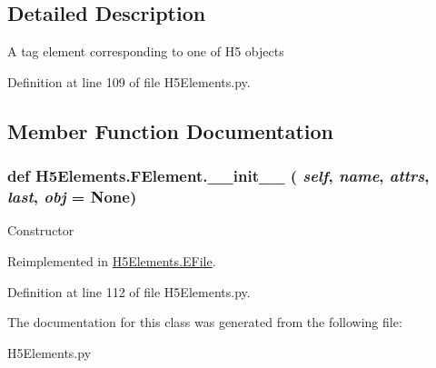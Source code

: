 \subsection{Detailed Description}
\begin{DoxyVerb}A tag element corresponding to one of H5 objects \end{DoxyVerb}
 

Definition at line 109 of file H5Elements.py.

\subsection{Member Function Documentation}
\hypertarget{classH5Elements_1_1FElement_ac013d152339bec50771f059a62e764c7}{
\subsubsection[{\_\-\_\-init\_\-\_\-}]{\setlength{\rightskip}{0pt plus 5cm}def H5Elements.FElement.\_\-\_\-init\_\-\_\- ( {\em self}, \/   {\em name}, \/   {\em attrs}, \/   {\em last}, \/   {\em obj} = {\ttfamily None})}}
\label{classH5Elements_1_1FElement_ac013d152339bec50771f059a62e764c7}
\begin{DoxyVerb}Constructor \end{DoxyVerb}
 

Reimplemented in \hyperlink{classH5Elements_1_1EFile_a8583b07993d4f52b537bb202bdb39863}{H5Elements.EFile}.

Definition at line 112 of file H5Elements.py.

The documentation for this class was generated from the following file:\begin{DoxyCompactItemize}
\item 
H5Elements.py\end{DoxyCompactItemize}
